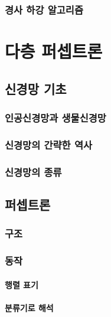 \documentclass [12pt] {oblivoir}
\let\oldsubsubsection=\subsubsection
\renewcommand{\subsubsection}
{
  \filbreak
  \oldsubsubsection
}
\begin{document}
\subsubsection{경사 하강 알고리즘}

\newpage
\section{다층 퍼셉트론}

\subsection{신경망 기초}

\subsubsection{인공신경망과 생물신경망}

\subsubsection{신경망의 간략한 역사}

\subsubsection{신경망의 종류}

\subsection{퍼셉트론}

\subsubsection{구조}

\subsubsection{동작}

\paragraph*{행렬 표기}\mbox{}

\vspace{3mm}

\paragraph*{분류기로 해석}\mbox{}
\end{document}
